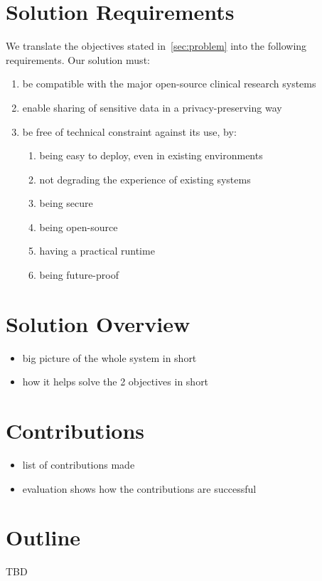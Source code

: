 \section{Solution Requirements}
\label{sec:requirements}

We translate the objectives stated in~\ref{sec:problem} into the following requirements.
Our solution must:

\begin{enumerate}
    \item be compatible with the major open-source clinical research systems %
    \item enable sharing of sensitive data in a privacy-preserving way
    \item be free of technical constraint against its use, by:
    \begin{enumerate}
        \item being easy to deploy, even in existing environments
        \item not degrading the experience of existing systems
        \item being secure
        \item being open-source
        \item having a practical runtime
        \item being future-proof
    \end{enumerate}
\end{enumerate}




\section{Solution Overview}

\begin{itemize}
    \item big picture of the whole system in short
    \item how it helps solve the 2 objectives in short
\end{itemize}


\section{Contributions}

\begin{itemize}
    \item list of contributions made
    \item evaluation shows how the contributions are successful
\end{itemize}


\section{Outline}
TBD
